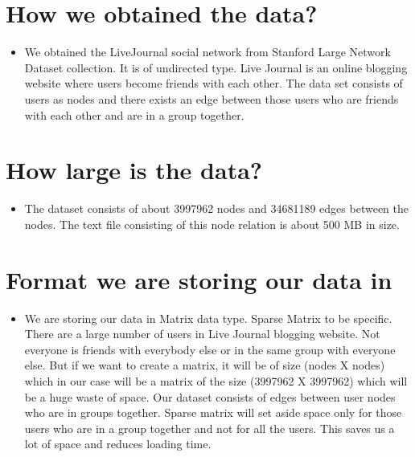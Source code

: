 \documentclass[11pt]{exam}
\begin{document}
\section{How we obtained the data?}
\begin{itemize}

\item[] We obtained the LiveJournal social network from Stanford Large Network Dataset collection. It is of undirected type. Live Journal is an online blogging website where users become friends with each other. The data set consists of users as nodes and there exists an edge between those users who are friends with each other and are in a group together. 

\end{itemize}

\section{How large is the data?}

\begin{itemize}

\item[] The dataset consists of about 3997962 nodes and 34681189 edges between the nodes. The text file consisting of this node relation is about 500 MB in size. 

\end{itemize}

\section{Format we are storing our data in}

\begin{itemize}

\item[] We are storing our data in Matrix data type. Sparse Matrix to be specific. There are a large number of users in Live Journal blogging website. Not everyone is friends with everybody else or in the same group with everyone else. But if we want to create a matrix, it will be of size (nodes X nodes) which in our case will be a matrix of the size (3997962 X 3997962) which will be a huge waste of space. Our dataset consists of edges between user nodes who are in groups together. Sparse matrix will set aside space only for those users who are in a group together and not for all the users. This saves us a lot of space and reduces loading time.    

\end{itemize}
\end{document}
